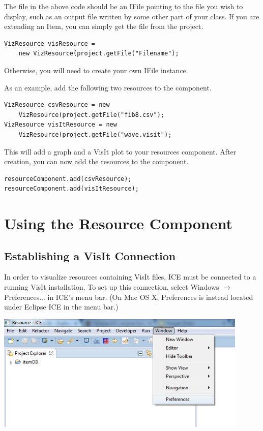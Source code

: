 \documentclass{article}
\begin{document}
The file in the above code should be an IFile pointing to the file you
wish to display, such as an output file written by some other part of your
class. If you are extending an Item, you can simply get the file from the
project.

\begin{verbatim}
VizResource visResource = 
	new VizResource(project.getFile("Filename");
\end{verbatim}

Otherwise, you will need to create your own IFile instance.

As an example, add the following two resources to the component.

\begin{verbatim}
VizResource csvResource = new 
	VizResource(project.getFile("fib8.csv");
VizResource visItResource = new 
	VizResource(project.getFile("wave.visit");
\end{verbatim}

This will add a graph and a VisIt plot to your resources component. After
creation, you can now add the resources to the component.

\begin{verbatim}
resourceComponent.add(csvResource);
resourceComponent.add(visItResource);
\end{verbatim} 

\section{Using the Resource Component}

\subsection{Establishing a VisIt Connection}

In order to visualize resources containing VisIt files, ICE must be connected to
a running VisIt installation. To set up this connection, select Windows
$\rightarrow$ Preferences... in ICE's menu bar. (On Mac OS X, Preferences is
instead located under Eclipse ICE in the menu bar.)

\begin{center}
\includegraphics[width=12cm]{images/ICEPreferences}
\end{center}
\end{document}
